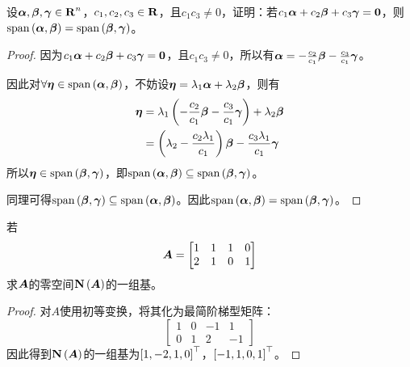 \begin{problem}
设\(\vecal,\vecbeta,\vecgamma\in\rea^n\)，\(c_1,c_2,c_3\in\rea\)，且\(c_1c_3\neq0\)，证明：若\(c_1\vecal+c_2\vecbeta+c_3\vecgamma=\veczero\)，则\(\myspan{\vecal,\vecbeta}=\myspan{\vecbeta,\vecgamma}\)。
\end{problem}
\begin{proof}
    因为\(c_1\vecal+c_2\vecbeta+c_3\vecgamma=\veczero\)，且\(c_1c_3\neq0\)，所以有\(\vecal=-\frac{c_2}{c_1}\vecbeta-\frac{c_3}{c_1}\vecgamma\)。

    因此对\(\forall\veceta\in\myspan{\vecal,\vecbeta}\)，不妨设\(\veceta=\lambda_1\vecal+\lambda_2\vecbeta\)，则有
    \begin{align*}
        \veceta & =\lambda_1\mypar{-\frac{c_2}{c_1}\vecbeta-\frac{c_3}{c_1}\vecgamma}+\lambda_2\vecbeta \\
                & =\mypar{\lambda_2-\frac{c_2\lambda_1}{c_1}}\vecbeta-\frac{c_3\lambda_1}{c_1}\vecgamma
    \end{align*}
    所以\(\veceta\in\myspan{\vecbeta,\vecgamma}\)，即\(\myspan{\vecal,\vecbeta}\subseteq\myspan{\vecbeta,\vecgamma}\)。

    同理可得\(\myspan{\vecbeta,\vecgamma}\subseteq\myspan{\vecal,\vecbeta}\)。因此\(\myspan{\vecal,\vecbeta}=\myspan{\vecbeta,\vecgamma}\)。
\end{proof}

\begin{problem}
若
\begin{equation*}
    \mata=\begin{bmatrix}1&1&1&0\\2&1&0&1\end{bmatrix}
\end{equation*}
求\(\mata\)的零空间\(\nullsp{\mata}\)的一组基。
\end{problem}
\begin{proof}
    对\(A\)使用初等变换，将其化为最简阶梯型矩阵：
    \begin{equation*}
        \begin{bmatrix}
            1 & 0 & -1 & 1  \\
            0 & 1 & 2  & -1
        \end{bmatrix}
    \end{equation*}
    因此得到\(\nullsp{\mata}\)的一组基为\(\mat{1,-2,1,0}^\top\)，\(\mat{-1,1,0,1}^\top\)。
\end{proof}

